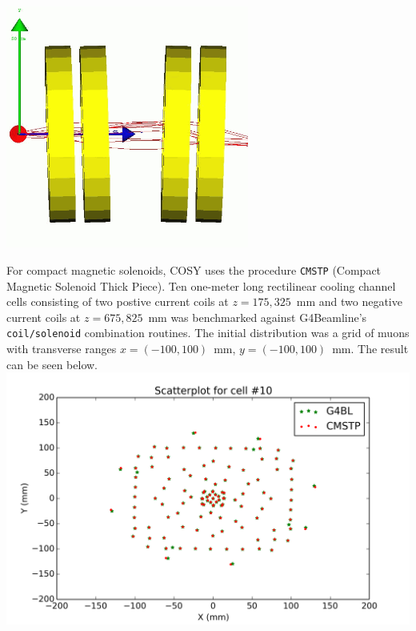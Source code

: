 \documentclass[portrait,a0paper,fontscale=0.285]{baposter} %
\begin{document}
\begin{poster}
{
\begin{center}
\includegraphics[width=0.6\textwidth]{Figures/vcc_cell.png}
\end{center}
For compact magnetic solenoids, COSY uses the procedure \texttt{CMSTP} (Compact Magnetic Solenoid Thick Piece). Ten one-meter long rectilinear cooling channel cells consisting of two postive current coils at $z = 175, 325$~mm and two negative current coils at $z = 675, 825$~mm was benchmarked against G4Beamline's \texttt{coil/solenoid} combination routines. The initial distribution was a grid of muons with transverse ranges $x = (-100, 100)$~mm, $y = (-100, 100)$~mm. The result can be seen below.
\includegraphics[width=\textwidth]{Figures/grid_cell_10.png}
}



\end{poster}
\end{document}
